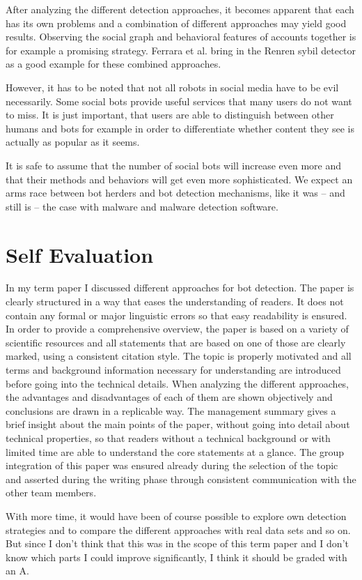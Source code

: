 After analyzing the different detection approaches, it becomes apparent that each has its own problems and a combination of different approaches may yield good results. Observing the social graph and behavioral features of accounts together is for example a promising strategy. Ferrara et al. \cite{ferrara15} bring in the Renren sybil detector \cite{wang2013, yang2014} as a good example for these combined approaches.

However, it has to be noted that not all robots in social media have to be evil necessarily. Some social bots provide useful services that many users do not want to miss. It is just important, that users are able to distinguish between other humans and bots for example in order to differentiate whether content they see is actually as popular as it seems.

It is safe to assume that the number of social bots will increase even more and that their methods and behaviors will get even more sophisticated. We expect an arms race between bot herders and bot detection mechanisms, like it was -- and still is -- the case with malware and malware detection software.
\section*{Self Evaluation}
In my term paper I discussed different approaches for bot detection. The paper is clearly structured in a way that eases the understanding of readers. It does not contain any formal or major linguistic errors so that easy readability is ensured. In order to provide a comprehensive overview, the paper is based on a variety of scientific resources and all statements that are based on one of those are clearly marked, using a consistent citation style. The topic is properly motivated and all terms and background information necessary for understanding are introduced before going into the technical details. When analyzing the different approaches, the advantages and disadvantages of each of them are shown objectively and conclusions are drawn in a replicable way. The management summary gives a brief insight about the main points of the paper, without going into detail about technical properties, so that readers without a technical background or with limited time are able to understand the core statements at a glance.
The group integration of this paper was ensured already during the selection of the topic and asserted during the writing phase through consistent communication with the other team members.

With more time, it would have been of course possible to explore own detection strategies and to compare the different approaches with real data sets and so on. But since I don’t think that this was in the scope of this term paper and I don’t know which parts I could improve significantly, I think it should be graded with an A. 


